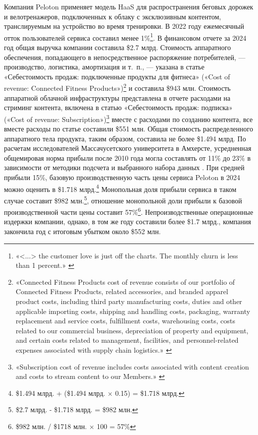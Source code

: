 \documentclass{article}
\begin{document}
Компания Peloton применяет модель HaaS для распространения беговых дорожек и велотренажеров, подключенных к облаку с эксклюзивным контентом, транслируемым на устройство во время тренировки. В 2022 году ежемесячный отток пользователей сервиса составил менее 1\%\footnote{«<...> the customer love is just off the charts. The monthly churn is less than 1 percent.» \cite{nyTimesPeloton2022}}. В финансовом отчете за 2024 год общая выручка компании составила \$2.7 млрд. Стоимость аппаратного обеспечения, попадающего в непосредственное распоряжение потребителей, — производство, логистика, амортизация и т.~п., — указана в статье «Себестоимость продаж: подключенные продукты для фитнеса» («Cost of revenue: Connected Fitness Products»)\footnote{«Connected Fitness Products cost of revenue consists of our portfolio of Connected Fitness Products, related accessories, and branded apparel product costs, including third party manufacturing costs, duties and other applicable importing costs, shipping and handling costs, packaging, warranty replacement and service costs, fulfillment costs, warehousing costs, costs related to our commercial business, depreciation of property and equipment, and certain costs related to management, facilities, and personnel-related expenses associated with supply chain logistics.» \cite{peloton10K2024}} и составила \$943 млн. Стоимость аппаратной облачной инфраструктуры представлена в отчете расходами на стриминг контента, включена в статью «Себестоимость продаж: подписка» («Cost of revenue: Subscription»)\footnote{«Subscription cost of revenue includes costs associated with content creation and costs to stream content to our Members.» \cite{peloton10K2024}} вместе с расходами по созданию контента, все вместе расходы по статье составили \$551 млн. Общая стоимость распределенного аппаратного тела продукта, таким образом, составила не более \$1.494 млрд. По расчетам исследователей Массачусетского университета в Амхерсте, усредненная общемировая норма прибыли после 2010 года могла составлять от 11\% до 23\% в зависимости от методики подсчета и выбранного набора данных \cite{worldProfitRates}. При средней прибыли 15\%, базовую производственную часть цены сервиса Peloton в 2024 можно оценить в \$1.718 млрд.\footnote{\$1.494 млрд. + (\$1.494 млрд. × 0.15) = \$1.718 млрд.} Монопольная доля прибыли сервиса в таком случае составит \$982 млн.\footnote{\$2.7 млрд. - \$1.718 млрд. = \$982 млн.}, отношение монопольной доли прибыли к базовой производственной части цены составит 57\%\footnote{\$982 млн. / \$1718 млн. × 100 = 57\%}. Непроизводственные операционные издержки компании, однако, в том же году составили более \$1.7 млрд., компания закончила год с итоговым убытком около \$552 млн.
\end{document}
